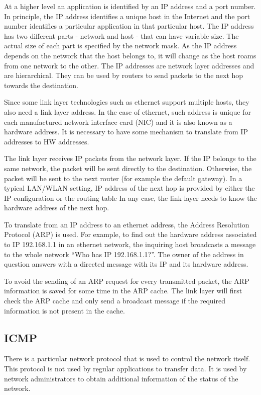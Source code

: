 At a higher level an application is identified by an IP address and a port number. 
In principle, the IP address identifies a unique host in the Internet and the port number identifies a particular application in that particular host.
The IP address has two different parts - network and host -  that can have variable size.
The actual size of each part is specified by the network mask.
As the IP address depends on the network that the host belongs to, it will change as the host roams from one network to the other.
The IP addresses are network layer addresses and are hierarchical.
They can be used by routers to send packets to the next hop towards the destination.

Since some link layer technologies such as ethernet support multiple hosts, they also need a link layer address.
In the case of ethernet, such address is unique for each manufactured network interface card (NIC) and it is also known as a hardware address.
It is necessary to have some mechanism to translate from IP addresses to HW addresses.

The link layer receives IP packets from the network layer.
If the IP belongs to the same network, the packet will be sent directly to the destination.
Otherwise, the packet will be sent to the next router (for example the default gateway).
In a typical LAN/WLAN setting,  IP address of the next hop is provided by either the IP configuration or the routing table
In any case, the link layer needs to know the hardware address of the next hop.

To translate from an IP address to an ethernet address, the Address Resolution Protocol (ARP) is used.
For example, to find out the hardware address associated to IP 192.168.1.1 in an ethernet network, the inquiring host broadcasts a message to the whole network ``Who has IP 192.168.1.1?''.
The owner of the address in question answers with a directed message with its IP and its hardware address.

To avoid the sending of an ARP request for every transmitted packet, the ARP information is saved for some time in the ARP cache.
The link layer will first check the ARP cache and only send a broadcast message if the required information is not present in the cache.


\subsection{ICMP}

There is a particular network protocol that is used to control the network itself.
This protocol is not used by regular applications to transfer data. 
It is used by network administrators to obtain additional information of the status of the network.

